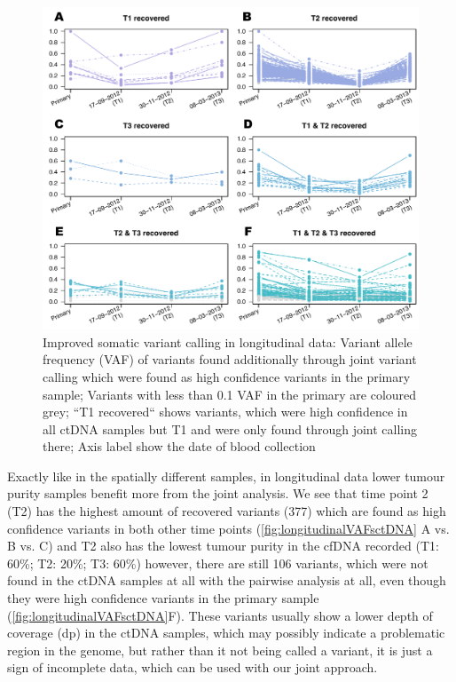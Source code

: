 \begin{figure}[!ht]
\centering
\includegraphics[width=.99\linewidth]{Figures/longitudinalCA9ctDNAVafs.pdf}
\caption[Improved somatic variant calling in longitudinal data]{Improved somatic variant calling in longitudinal data: Variant allele frequency (VAF) of variants found additionally through joint variant calling which were found as high confidence variants in the primary sample; Variants with less than 0.1 VAF in the primary are coloured grey; ``T1 recovered`` shows variants, which were high confidence in all ctDNA samples but T1 and were only found through joint calling there; Axis label show the date of blood collection }\label{fig:longitudinalVAFsctDNA}
\end{figure}

Exactly like in the spatially different samples, in longitudinal data lower tumour purity samples benefit more from the joint analysis. We see that time point 2 (T2) has the highest amount of recovered variants (377) which are found as high confidence variants in both other time points (\autoref{fig:longitudinalVAFsctDNA} A vs. B vs. C) and T2 also has the lowest tumour purity in the cfDNA recorded (T1: 60\%; T2: 20\%; T3: 60\%) however, there are still 106 variants, which were not found in the ctDNA samples at all with the pairwise analysis at all, even though they were high confidence variants in the primary sample (\autoref{fig:longitudinalVAFsctDNA}F). These variants usually show a lower depth of coverage (dp) in the ctDNA samples, which may possibly indicate a problematic region in the genome, but rather than it not being called a variant, it is just a sign of incomplete data, which can be used with our joint approach. 

